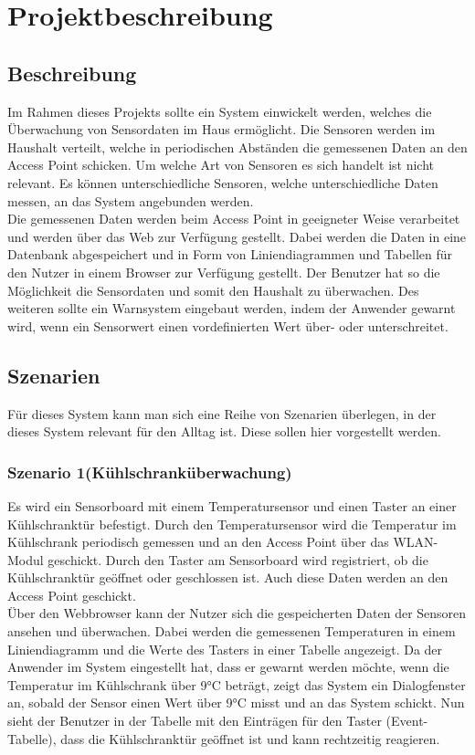 \documentclass[12pt,a4paper,twoside]{article}
\newcommand{\labelSec}[1]{\label{sec:#1}}
\begin{document}
\section{Projektbeschreibung}\labelSec{abschnitt}

\subsection{Beschreibung}

Im Rahmen dieses Projekts sollte ein System einwickelt werden, welches die Überwachung von Sensordaten im Haus ermöglicht. Die Sensoren werden im Haushalt verteilt, welche in periodischen Abständen die gemessenen Daten an den Access Point schicken. Um welche Art von Sensoren es sich handelt ist nicht relevant. Es können unterschiedliche Sensoren, welche unterschiedliche Daten messen, an das System angebunden werden.\\
Die gemessenen Daten werden beim Access Point in geeigneter Weise verarbeitet und werden über das Web zur Verfügung gestellt. Dabei werden die Daten in eine Datenbank abgespeichert und in Form von Liniendiagrammen und Tabellen für den Nutzer in einem Browser zur Verfügung gestellt. Der Benutzer hat so die Möglichkeit die Sensordaten und somit den Haushalt zu überwachen.
Des weiteren sollte ein Warnsystem eingebaut werden, indem der Anwender gewarnt wird, wenn ein Sensorwert einen vordefinierten Wert über- oder unterschreitet.

\subsection{Szenarien}
Für dieses System kann man sich eine Reihe von Szenarien überlegen, in der dieses System relevant für den Alltag ist. Diese sollen hier vorgestellt werden.

\subsubsection{Szenario 1(Kühlschranküberwachung)}
Es wird ein Sensorboard mit einem Temperatursensor und einen Taster an einer Kühlschranktür befestigt. Durch den Temperatursensor wird die Temperatur im Kühlschrank periodisch gemessen und an den Access Point über das WLAN-Modul geschickt. Durch den Taster am Sensorboard wird registriert, ob die Kühlschranktür geöffnet oder geschlossen ist. Auch diese Daten werden an den Access Point geschickt. \\
Über den Webbrowser kann der Nutzer sich die gespeicherten Daten der Sensoren ansehen und überwachen. Dabei werden die gemessenen Temperaturen in einem Liniendiagramm und die Werte des Tasters in einer Tabelle angezeigt. Da der Anwender im System eingestellt hat, dass er gewarnt werden möchte, wenn die Temperatur im Kühlschrank über 9°C beträgt, zeigt das System ein Dialogfenster an, sobald der Sensor einen Wert über 9°C misst und an das System schickt. Nun sieht der Benutzer in der Tabelle mit den Einträgen für den Taster (Event-Tabelle), dass die Kühlschranktür geöffnet ist und kann rechtzeitig reagieren.
\end{document}
